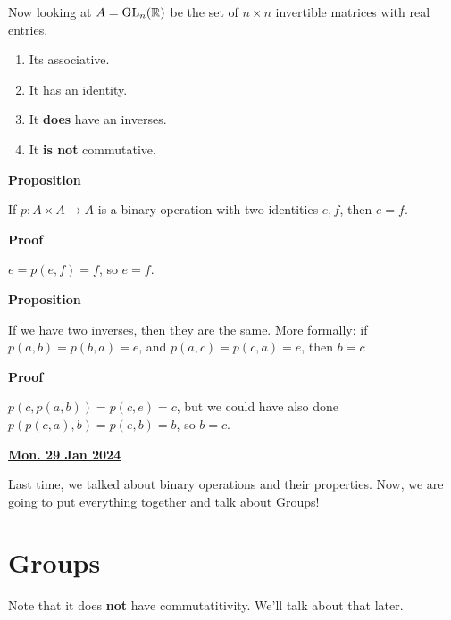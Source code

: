 \documentclass[12pt]{article}
\renewcommand{\date}[1]{\underline{\bf #1}}
\def\gl{\text{GL}}
\begin{document}
Now looking at $A = \gl_n(\R)$ be the set of $n \times n$ invertible matrices
with real entries.

\begin{enumerate}
	\item Its associative.
	\item It has an identity.
	\item It {\bf does} have an inverses.
	\item It {\bf is not} commutative.
\end{enumerate}

{\bf Proposition}

If $p: A \times A \to A$ is a binary operation with two identities $e, f$,
then $e = f$.

	{\bf Proof}

$e = p(e, f) = f$, so $e = f$.


	{\bf Proposition}

If we have two inverses, then they are the same. More formally: if $p(a, b) =
	p(b, a)= e$, and $p(a, c) = p(c, a) = e$, then $b = c$

{\bf Proof}

$p(c, p(a, b)) = p(c, e) = c$, but we could have also done $p(p(c, a), b) =
	p(e, b) = b$, so $b = c$.

\date{Mon. 29 Jan 2024}


Last time, we talked about binary operations and their properties. Now, we are
going to put everything together and talk about Groups!

\section{Groups}


Note that it does {\bf not} have commutatitivity. We'll talk about that
later.
\end{document}
